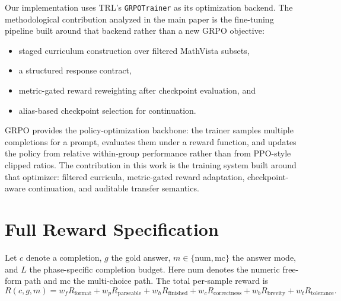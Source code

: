 \documentclass{article} %
\begin{document}
Our implementation uses TRL's \texttt{GRPOTrainer} as its optimization backend. The methodological contribution analyzed in the main paper is the fine-tuning pipeline built around that backend rather than a new GRPO objective:
\begin{itemize}[leftmargin=1.2em]
\item staged curriculum construction over filtered MathVista subsets,
\item a structured response contract,
\item metric-gated reward reweighting after checkpoint evaluation, and
\item alias-based checkpoint selection for continuation.
\end{itemize}
GRPO provides the policy-optimization backbone: the trainer samples multiple completions for a prompt, evaluates them under a reward function, and updates the policy from relative within-group performance rather than from PPO-style clipped ratios. The contribution in this work is the training system built around that optimizer: filtered curricula, metric-gated reward adaptation, checkpoint-aware continuation, and auditable transfer semantics.

\section{Full Reward Specification}

Let $c$ denote a completion, $g$ the gold answer, $m \in \{\mathrm{num}, \mathrm{mc}\}$ the answer mode, and $L$ the phase-specific completion budget. Here $\mathrm{num}$ denotes the numeric free-form path and $\mathrm{mc}$ the multi-choice path. The total per-sample reward is
\begin{equation}
R(c,g,m)=
w_f R_{\mathrm{format}} +
w_p R_{\mathrm{parseable}} +
w_h R_{\mathrm{finished}} +
w_c R_{\mathrm{correctness}} +
w_b R_{\mathrm{brevity}} +
w_t R_{\mathrm{tolerance}}.
\end{equation}
\end{document}
